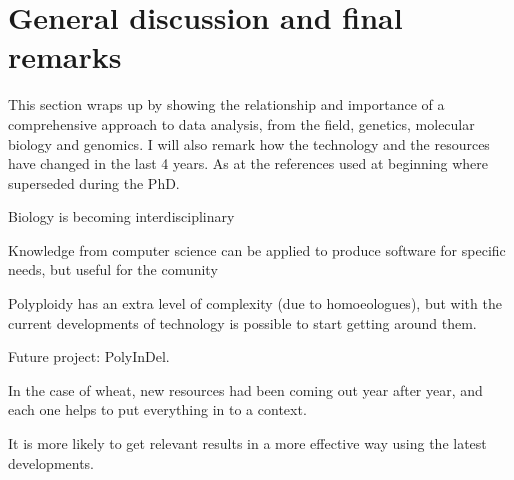 
\chapter{General discussion and final remarks}
This section wraps up by showing the relationship and importance of a comprehensive approach to data analysis, from the field, genetics, molecular biology and genomics. I will also remark how the technology and the resources have changed in the last 4 years. As at the references used at beginning where superseded during the PhD. 


Biology is becoming interdisciplinary

Knowledge from  computer science can be applied to produce software for specific needs, but useful for the comunity

Polyploidy has an extra level of complexity (due to homoeologues), but with the current developments of technology is possible to start getting around them. 

Future project: PolyInDel. 

In the case of wheat, new resources had been coming out year after year, and each one helps to put everything in to a context. 

It is more likely to get relevant results in a more effective way using the latest developments. 

